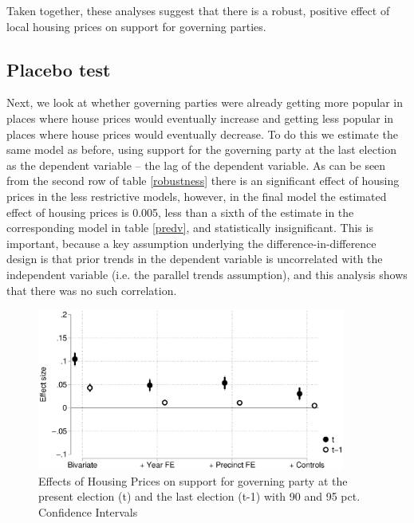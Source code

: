 \documentclass[12pt,a4paper]{article}
\begin{document}
Taken together, these analyses suggest that there is a robust, positive effect of local housing prices on support for governing parties.

\subsection{Placebo test}
Next, we look at whether  governing parties were already getting more popular in places where house prices would eventually increase and getting less popular in places where house prices would eventually decrease. To do this we estimate the same model as before, using support for the governing party at the last election as the dependent variable -- the lag of the dependent variable. As can be seen from the second row of table \ref{robustness} there is an significant effect of housing prices in the less restrictive models, however, in the final model the estimated effect of housing prices is 0.005, less than a sixth of the estimate in the corresponding model in table \ref{predv}, and statistically insignificant. This is important, because a key assumption underlying the difference-in-difference design is that prior trends in the dependent variable is uncorrelated with the independent variable  (i.e. the parallel trends assumption), and this analysis shows that there was no such correlation.

\begin{figure}[htbp!]
	\includegraphics[width=0.9\textwidth]{../figures/lagdv.eps}
	\centering
	\caption{Effects of Housing Prices on support for governing party at the present election (t) and the last election (t-1) with 90  and 95 pct. Confidence Intervals}\label{placebo}
\end{figure}
\end{document}
